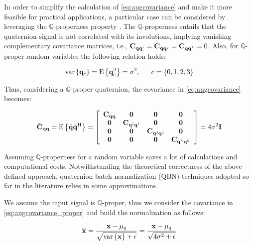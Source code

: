 \documentclass[graybox]{svmult}
\begin{document}
In order to simplify the calculation of \eqref{eq:augcovariance} and make it more feasible for practical applications, a particular case can be considered by leveraging the $\mathbb{Q}$-properness property \cite{ViaTIT2010, TookSIGPRO2011, GrassucciICASSP2021}. The $\mathbb{Q}$-properness entails that the quaternion signal is not correlated with its involutions, implying vanishing complementary covariance matrices, i.e., ${\mathbf C}_{{\mathbf q}{\mathbf q}^i} = {\mathbf C}_{{\mathbf q}{\mathbf q}^j} = {\mathbf C}_{{\mathbf q}{\mathbf q}^k} = 0$. Also, for $\mathbb{Q}$-proper random variables the following relation holds:

\begin{equation}
    \operatorname{var}\left\{{\mathbf q}_c\right\} = \text{E}\left\{{\mathbf q}_c^2 \right\} = \sigma^2, \; \ \ \ \ c=\{0, 1, 2, 3\}
\label{eq:qproper}
\end{equation}

\noindent Thus, considering a $\mathbb{Q}$-proper quaternion, the covariance in \eqref{eq:augcovariance} becomes:

\begin{equation}
	\tilde{\C}_{\q\q} = \E\left\{\tilde{\q}\tilde{\q}\tH\right\} 
	= \left[{\begin{array}{*{20}c} {{\C}_{\q\q}} & {\mathbf{0}} & {\mathbf{0}} & {\mathbf{0}}\\
	{\mathbf{0}} & {{\C}_{\q^\ii \q^\ii}} & {\mathbf{0}} & {\mathbf{0}}\\
	{\mathbf{0}} & {\mathbf{0}} & {{\C}_{\q^\ij \q^\ij}} & {\mathbf{0}}\\
	{\mathbf{0}} & {\mathbf{0}} & {\mathbf{0}} & {{\C}_{\q^\ik \q^\ik}}\\
	\end{array}} \right]
	= 4\sigma^2 \mathbf{I}
	\label{eq:augcovariance_proper}
\end{equation}

Assuming $\mathbb{Q}$-properness for a random variable  saves a lot of calculations and computational costs. Notwithstanding the theoretical correctness of the above defined approach, quaternion batch normalization (QBN) techniques adopted so far in the literature relies in some approximations.

We assume the input signal is $\mathbb{Q}$-proper, thus we consider the covariance in \eqref{eq:augcovariance_proper} and build the normalization as follows:

\begin{equation}
    \overline{\mathbf{x}} = \frac{\mathbf{x} - \mu_q}{\sqrt{\operatorname{var}\left\{\mathbf{x}\right\} + \epsilon}} = \frac{\mathbf{x} - \mu_q}{\sqrt{4\sigma^2 + \epsilon}}
\label{eq:q_normal}
\end{equation}
\end{document}
